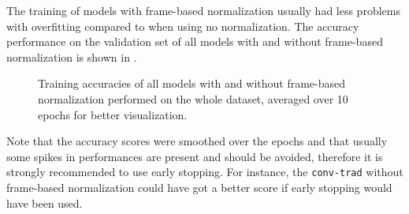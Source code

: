 \FloatBarrier
\noindent
The training of models with frame-based normalization usually had less problems with overfitting compared to when using no normalization.
The accuracy performance on the validation set of all models with and without frame-based normalization is shown in .
\begin{figure}[!ht]
  \centering
  \caption{Training accuracies of all models with and without frame-based normalization performed on the whole dataset, averaged over 10 epochs for better visualization.}
  \label{fig:exp_final_acc}
\end{figure}
\FloatBarrier
\noindent
Note that the accuracy scores were smoothed over the epochs and that usually some spikes in performances are present and should be avoided, therefore it is strongly recommended to use early stopping.
For instance, the \texttt{conv-trad} without frame-based normalization could have got a better score if early stopping would have been used.

